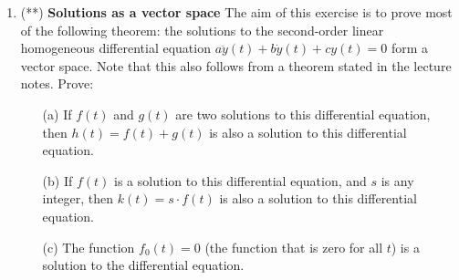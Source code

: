 \documentclass[11pt,a4paper]{scrartcl}
\begin{document}
\begin{enumerate}

	
	\item (**) \textbf{Solutions as a vector space}	
	The aim of this exercise is to prove most of the following theorem:
	the solutions to the second-order linear homogeneous differential equation
	$a\ddot{y}(t) + b\dot{y}(t) + cy(t) = 0$ form a vector space. Note that this also follows from a theorem stated in the lecture notes. Prove:
	\begin{itemize}
		\item[(a)] If $f(t)$ and $g(t)$ are two solutions to this differential equation, then $h(t) = f(t) + g(t)$ is also a solution to this differential equation.
		\item[(b)] If $f(t)$ is a solution to this differential equation,
		and $s$ is any integer, then $k(t) = s \cdot f(t)$ is also a solution to this differential equation.
		\item[(c)] The function $f_0(t) = 0$ (the function that is zero for all $t$) is a solution to the differential equation.
	\end{itemize}
	
         
        
\end{enumerate}
\end{document}
